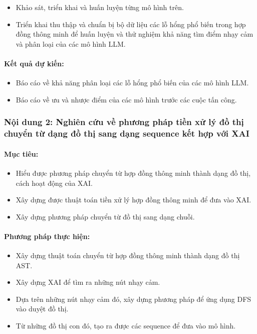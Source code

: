 \documentclass[letterpaper]{article}
\begin{document}
\begin{itemize}
    \item Khảo sát, triển khai và huấn luyện từng mô hình trên.
    \item Triển khai thu thập và chuẩn bị bộ dữ liệu các lỗ hổng phổ biến trong hợp đồng thông minh để huấn luyện và thử nghiệm khả năng tìm điểm nhạy cảm và phân loại của các mô hình LLM.
\end{itemize}

\paragraph{Kết quả dự kiến:}

\begin{itemize}
    \item Báo cáo về khả năng phân loại các lỗ hổng phổ biến của các mô hình LLM.
    \item Báo cáo về ưu và nhược điểm của các mô hình trước các cuộc tấn công.
\end{itemize}

\subsubsection{Nội dung 2: Nghiên cứu về phương pháp tiền xử lý đồ thị chuyển từ dạng đồ thị sang dạng sequence kết hợp với XAI}

\paragraph{Mục tiêu:}
\begin{itemize}
    \item Hiểu được phương pháp chuyển từ hợp đồng thông minh thành dạng đồ thị, cách hoạt động của XAI.
    \item Xây dựng được thuật toán tiền xử lý hợp đồng thông minh để đưa vào XAI.
    \item Xây dựng phương pháp chuyển từ đồ thị sang dạng chuỗi.
\end{itemize}

\paragraph{Phương pháp thực hiện:}
\begin{itemize}
    \item Xây dựng thuật toán chuyển từ hợp đồng thông minh thành dạng đồ thị AST.
    \item Xây dựng XAI để tìm ra những nút nhạy cảm.
    \item Dựa trên những nút nhạy cảm đó, xây dựng phương pháp để ứng dụng DFS vào duyệt đồ thị.
    \item Từ những đồ thị con đó, tạo ra được các sequence để đưa vào mô hình.
\end{itemize}
\end{document}
